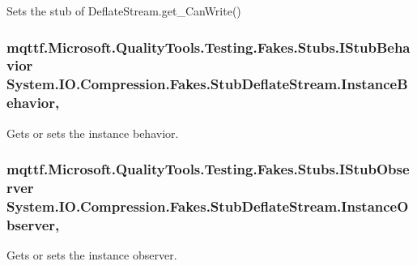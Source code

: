 Sets the stub of Deflate\-Stream.\-get\-\_\-\-Can\-Write()

\hypertarget{class_system_1_1_i_o_1_1_compression_1_1_fakes_1_1_stub_deflate_stream_ae721d1e944d96c95f39d1effc284ce5f}{
\subsubsection[{Instance\-Behavior}]{\setlength{\rightskip}{0pt plus 5cm}mqttf.\-Microsoft.\-Quality\-Tools.\-Testing.\-Fakes.\-Stubs.\-I\-Stub\-Behavior System.\-I\-O.\-Compression.\-Fakes.\-Stub\-Deflate\-Stream.\-Instance\-Behavior\hspace{0.3cm}{\ttfamily [get]}, {\ttfamily [set]}}}\label{class_system_1_1_i_o_1_1_compression_1_1_fakes_1_1_stub_deflate_stream_ae721d1e944d96c95f39d1effc284ce5f}


Gets or sets the instance behavior.

\hypertarget{class_system_1_1_i_o_1_1_compression_1_1_fakes_1_1_stub_deflate_stream_a6ea20726feb7d2bc2a9b56c2b2e320dd}{
\subsubsection[{Instance\-Observer}]{\setlength{\rightskip}{0pt plus 5cm}mqttf.\-Microsoft.\-Quality\-Tools.\-Testing.\-Fakes.\-Stubs.\-I\-Stub\-Observer System.\-I\-O.\-Compression.\-Fakes.\-Stub\-Deflate\-Stream.\-Instance\-Observer\hspace{0.3cm}{\ttfamily [get]}, {\ttfamily [set]}}}\label{class_system_1_1_i_o_1_1_compression_1_1_fakes_1_1_stub_deflate_stream_a6ea20726feb7d2bc2a9b56c2b2e320dd}


Gets or sets the instance observer.

